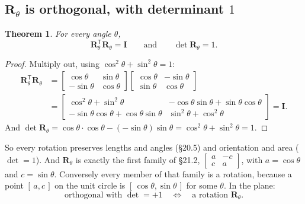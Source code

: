 \documentclass[11pt]{article}
\theoremstyle{plain}
\newtheorem{thm}{Theorem}[section]
\theoremstyle{definition}
\theoremstyle{remark}
\newcommand{\mt}[1]{\mathbf{#1}}
\newcommand{\T}{^{\mathsf{T}}}
\begin{document}
\subsection{\texorpdfstring{$\mt{R}_\theta$}{R\_theta} is orthogonal, with determinant \texorpdfstring{$1$}{1}}
\begin{thm}
\label{thm:rotorth}
For every angle $\theta$,
\[
  \mt{R}_\theta\T\mt{R}_\theta=\mt{I}
  \qquad\text{and}\qquad
  \det\mt{R}_\theta=1 .
\]
\end{thm}

\begin{proof}
Multiply out, using $\cos^{2}\theta+\sin^{2}\theta=1$:
\[
  \begin{aligned}
  \mt{R}_\theta\T\mt{R}_\theta
  &=\begin{bmatrix}\cos\theta&\sin\theta\\-\sin\theta&\cos\theta\end{bmatrix}
   \begin{bmatrix}\cos\theta&-\sin\theta\\\sin\theta&\cos\theta\end{bmatrix}\\
  &=\begin{bmatrix}\cos^{2}\theta+\sin^{2}\theta & -\cos\theta\sin\theta+\sin\theta\cos\theta\\
                  -\sin\theta\cos\theta+\cos\theta\sin\theta & \sin^{2}\theta+\cos^{2}\theta\end{bmatrix}
  =\mt{I}.
  \end{aligned}
\]
And $\det\mt{R}_\theta=\cos\theta\cdot\cos\theta-(-\sin\theta)\sin\theta
=\cos^{2}\theta+\sin^{2}\theta=1$.
\end{proof}

\noindent So every rotation preserves lengths and angles (\S20.5) and
orientation and area ($\det=1$). And $\mt{R}_\theta$ is exactly the first family
of \S21.2, $\begin{bmatrix}a&-c\\c&a\end{bmatrix}$, with $a=\cos\theta$ and
$c=\sin\theta$. Conversely every member of that family is a rotation, because a
point $[\,a,c\,]$ on the unit circle is $[\,\cos\theta,\sin\theta\,]$ for some
$\theta$. In the plane:
\[
  \text{orthogonal with }\det=+1
  \quad\Longleftrightarrow\quad
  \text{a rotation }\mt{R}_\theta .
\]
\end{document}

